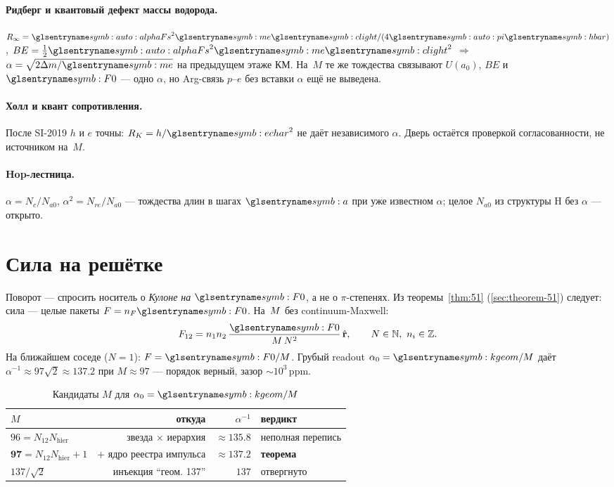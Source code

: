 \paragraph{Ридберг и квантовый дефект массы водорода.}
$R_\infty=\alphaFs^2 \massElectron \speedC/(4\symPi\planckHbar)$, $BE=\tfrac12\alphaFs^2 \massElectron \speedC^2$
$\Rightarrow$ $\alpha=\sqrt{2\Delta m/\massElectron}$ на предыдущем этаже КМ.
На~$M$ те же тождества связывают $U(a_0)$, $BE$ и $\ladderForce$ --- одно $\alpha$,
но Arg-связь $p$--$e$ без вставки $\alpha$ ещё не выведена.

\paragraph{Холл и квант сопротивления.}
После SI-2019 $h$ и $e$ точны: $R_K=h/\chargeE^2$ не даёт независимого $\alpha$.
Дверь остаётся проверкой согласованности, не источником на~$M$.

\paragraph{Hop-лестница.}
$\alpha=N_c/N_{a0}$, $\alpha^2=N_{re}/N_{a0}$ --- тождества длин в шагах $\caStepSpace$
при уже известном $\alpha$; целое $N_{a0}$ из структуры H без $\alpha$ --- открыто.

\section{Сила на решётке}
\label{sec:force-lattice}

Поворот --- спросить носитель о \emph{Кулоне на $\ladderForce$},
а не о $\pi$-степенях.
Из теоремы~\ref{thm:51} (\cref{sec:theorem-51}) следует: сила --- целые пакеты $F=n_F \ladderForce$.
На~$M$ без continuum-Maxwell:
\[
  F_{12}=n_1 n_2\,\frac{\ladderForce}{M\,N^{2}}\,\hat{\mathbf{r}},
  \qquad N\in\mathbb{N},\ n_i\in\mathbb{Z}.
\]
На ближайшем соседе ($N=1$): $F=\ladderForce/M$.
Грубый readout $\alpha_0=\caKappaGeom/M$ даёт $\alpha^{-1}\approx 97\sqrt{2}\approx 137.2$
при $M\approx 97$ --- порядок верный, зазор $\sim 10^3$\,ppm.

\begin{table}[ht]
\centering
\caption{Кандидаты $M$ для $\alpha_0=\caKappaGeom/M$}
\begin{tabular}{@{}lrrl@{}}
\toprule
$M$ & откуда & $\alpha^{-1}$ & вердикт \\
\midrule
$96=N_{12}N_{\mathrm{hier}}$ & звезда $\times$ иерархия & $\approx 135.8$ & неполная перепись \\
$\mathbf{97}=N_{12}N_{\mathrm{hier}}+1$ & + ядро реестра импульса & $\approx 137.2$ & \textbf{теорема} \\
$137/\sqrt{2}$ & инъекция ``геом. 137'' & $137$ & отвергнуто \\
\bottomrule
\end{tabular}
\end{table}

